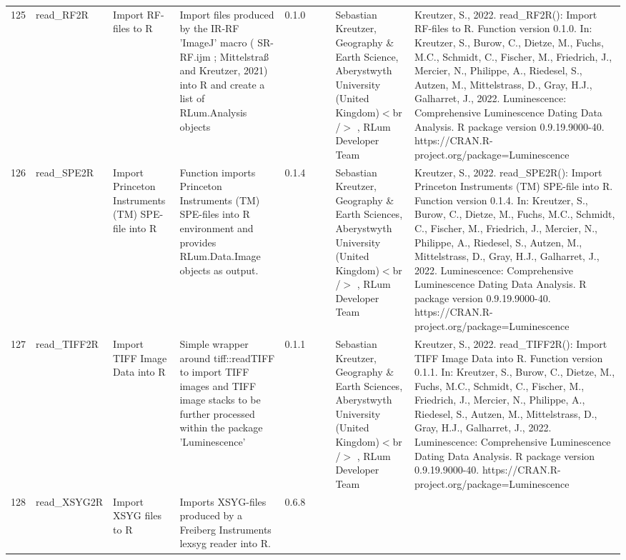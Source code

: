 \begin{table}[ht]
\begin{tabular}{rllllllll}
 \\ 
  125 & read\_RF2R & Import RF-files to R & Import files produced by the IR-RF 'ImageJ' macro ( SR-RF.ijm ; Mittelstraß and Kreutzer, 2021) into R and create a list of  RLum.Analysis  objects & 0.1.0
 &  &  & Sebastian Kreutzer, Geography \& Earth Science, Aberystwyth University (United Kingdom)$<$br /$>$ , RLum Developer Team & Kreutzer, S., 2022. read\_RF2R(): Import RF-files to R. Function version 0.1.0. In: Kreutzer, S., Burow, C., Dietze, M., Fuchs, M.C., Schmidt, C., Fischer, M., Friedrich, J., Mercier, N., Philippe, A., Riedesel, S., Autzen, M., Mittelstrass, D., Gray, H.J., Galharret, J., 2022. Luminescence: Comprehensive Luminescence Dating Data Analysis. R package version 0.9.19.9000-40. https://CRAN.R-project.org/package=Luminescence
 \\ 
  126 & read\_SPE2R & Import Princeton Instruments (TM) SPE-file into R & Function imports Princeton Instruments (TM) SPE-files into R environment and provides  RLum.Data.Image  objects as output. & 0.1.4
 &  &  & Sebastian Kreutzer, Geography \& Earth Sciences, Aberystwyth University (United Kingdom)$<$br /$>$ , RLum Developer Team & Kreutzer, S., 2022. read\_SPE2R(): Import Princeton Instruments (TM) SPE-file into R. Function version 0.1.4. In: Kreutzer, S., Burow, C., Dietze, M., Fuchs, M.C., Schmidt, C., Fischer, M., Friedrich, J., Mercier, N., Philippe, A., Riedesel, S., Autzen, M., Mittelstrass, D., Gray, H.J., Galharret, J., 2022. Luminescence: Comprehensive Luminescence Dating Data Analysis. R package version 0.9.19.9000-40. https://CRAN.R-project.org/package=Luminescence
 \\ 
  127 & read\_TIFF2R & Import TIFF Image Data into R & Simple wrapper around  tiff::readTIFF  to import TIFF images and TIFF image stacks to be further processed within the package  'Luminescence' & 0.1.1
 &  &  & Sebastian Kreutzer, Geography \& Earth Sciences, Aberystwyth University (United Kingdom)$<$br /$>$ , RLum Developer Team & Kreutzer, S., 2022. read\_TIFF2R(): Import TIFF Image Data into R. Function version 0.1.1. In: Kreutzer, S., Burow, C., Dietze, M., Fuchs, M.C., Schmidt, C., Fischer, M., Friedrich, J., Mercier, N., Philippe, A., Riedesel, S., Autzen, M., Mittelstrass, D., Gray, H.J., Galharret, J., 2022. Luminescence: Comprehensive Luminescence Dating Data Analysis. R package version 0.9.19.9000-40. https://CRAN.R-project.org/package=Luminescence
 \\ 
  128 & read\_XSYG2R & Import XSYG files to R & Imports XSYG-files produced by a Freiberg Instruments lexsyg reader into R. & 0.6.8

\end{tabular}
\end{table}
